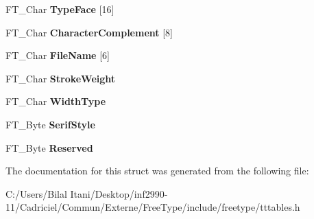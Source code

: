 \begin{DoxyCompactItemize}
\item 
F\+T\+\_\+\+Char {\bfseries Type\+Face} \mbox{[}16\mbox{]}\hypertarget{struct_t_t___p_c_l_t___a47c2c6b276f3ab2002fe03af41dad396}{}\label{struct_t_t___p_c_l_t___a47c2c6b276f3ab2002fe03af41dad396}

\item 
F\+T\+\_\+\+Char {\bfseries Character\+Complement} \mbox{[}8\mbox{]}\hypertarget{struct_t_t___p_c_l_t___a2641686beb550bcf8d9e598336f0acd9}{}\label{struct_t_t___p_c_l_t___a2641686beb550bcf8d9e598336f0acd9}

\item 
F\+T\+\_\+\+Char {\bfseries File\+Name} \mbox{[}6\mbox{]}\hypertarget{struct_t_t___p_c_l_t___a87691bde7cb06e3043f5320c8223e768}{}\label{struct_t_t___p_c_l_t___a87691bde7cb06e3043f5320c8223e768}

\item 
F\+T\+\_\+\+Char {\bfseries Stroke\+Weight}\hypertarget{struct_t_t___p_c_l_t___aaf28b05ac07bcdc1ae6f4ec9064434fc}{}\label{struct_t_t___p_c_l_t___aaf28b05ac07bcdc1ae6f4ec9064434fc}

\item 
F\+T\+\_\+\+Char {\bfseries Width\+Type}\hypertarget{struct_t_t___p_c_l_t___ad6613ad7556599343f999a7d27a0f1d0}{}\label{struct_t_t___p_c_l_t___ad6613ad7556599343f999a7d27a0f1d0}

\item 
F\+T\+\_\+\+Byte {\bfseries Serif\+Style}\hypertarget{struct_t_t___p_c_l_t___aa8e3d35937660a1e4959ee10a4800e6a}{}\label{struct_t_t___p_c_l_t___aa8e3d35937660a1e4959ee10a4800e6a}

\item 
F\+T\+\_\+\+Byte {\bfseries Reserved}\hypertarget{struct_t_t___p_c_l_t___a2e46e3f5eaa51e02d831d3f6143f8846}{}\label{struct_t_t___p_c_l_t___a2e46e3f5eaa51e02d831d3f6143f8846}

\end{DoxyCompactItemize}


The documentation for this struct was generated from the following file\+:\begin{DoxyCompactItemize}
\item 
C\+:/\+Users/\+Bilal Itani/\+Desktop/inf2990-\/11/\+Cadriciel/\+Commun/\+Externe/\+Free\+Type/include/freetype/tttables.\+h\end{DoxyCompactItemize}
